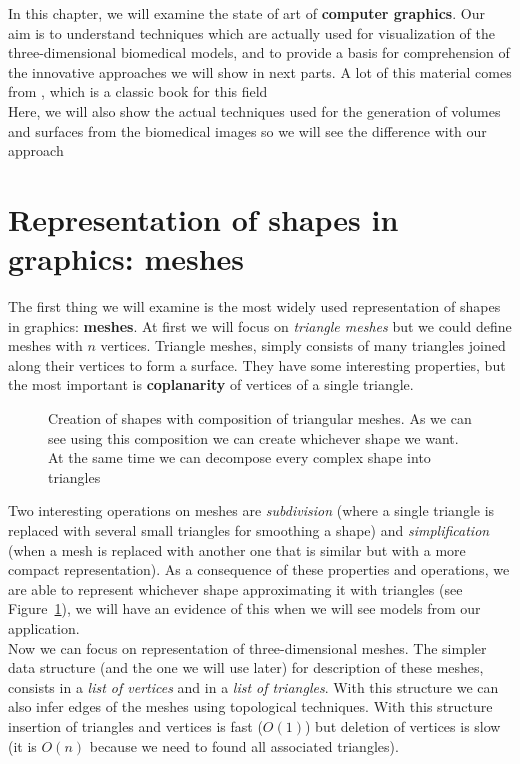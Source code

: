 In this chapter, we will examine the state of art of \textbf{computer graphics}. Our aim is to understand techniques which are actually used for visualization of the three-dimensional biomedical models, and to provide a basis for comprehension of the innovative approaches we will show in next parts. A lot of this material comes from \cite{Hughes}, which is a classic book for this field\\

Here, we will also show the actual techniques used for the generation of volumes and surfaces from the biomedical images so we will see the difference with our approach 

\section{Representation of shapes in graphics: meshes}\label{sec14:mesh}

The first thing we will examine is the most widely used representation of shapes in graphics: \textbf{meshes}. At first we will focus on \textit{triangle meshes} but we could define meshes with $n$ vertices. Triangle meshes, simply consists of many triangles joined along their vertices to form a surface. They have some interesting properties, but the most important is \textbf{coplanarity} of vertices of a single triangle.

\begin{figure}[htb] %
   \centering
   
   \caption[Examples of triangular meshes]{Creation of shapes with composition of triangular meshes. As we can see using this composition we can create whichever shape we want. At the same time we can decompose every complex shape into triangles}
   \label{fig:triangularMeshes}
\end{figure}

Two interesting operations on meshes are \textit{subdivision} (where a single triangle is replaced with several small triangles for smoothing a shape) and \textit{simplification} (when a mesh is replaced with another one that is similar but with a more compact representation). As a consequence of these properties and operations, we are able to represent whichever shape approximating it with triangles (see Figure~\ref{fig:triangularMeshes}), we will have an evidence of this when we will see models from our application.\\

Now we can focus on representation of three-dimensional meshes. The simpler data structure (and the one we will use later) for description of these meshes, consists in a \textit{list of vertices} and in a \textit{list of triangles}. With this structure we can also infer edges of the meshes using topological techniques. With this structure insertion of triangles and vertices is fast ($O(1)$) but deletion of vertices is slow (it is $O(n)$ because we need to found all associated triangles).

